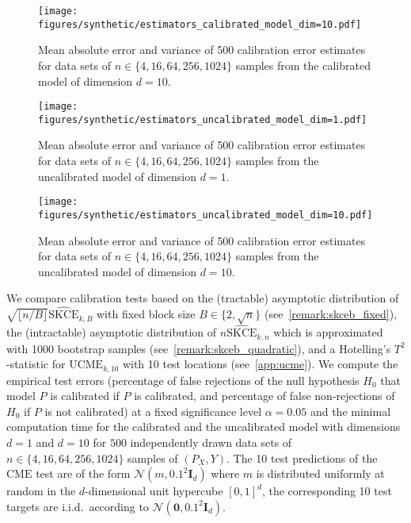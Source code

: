 \documentclass{article}
\begin{document}
\begin{figure}[hpt]
    \begin{center}
        \texttt{[image: figures/synthetic/estimators\_calibrated\_model\_dim=10.pdf]}
        \caption{Mean absolute error and variance of 500 calibration error estimates for
        data sets of $n \in \{4, 16, 64, 256, 1024\}$ samples from the calibrated model
        of dimension $d = 10$.}
        \label{fig:synthetic_estimators_calibrated_10}
    \end{center}
\end{figure}

\begin{figure}[hpt]
    \begin{center}
        \texttt{[image: figures/synthetic/estimators\_uncalibrated\_model\_dim=1.pdf]}
        \caption{Mean absolute error and variance of 500 calibration error estimates for
        data sets of $n \in \{4, 16, 64, 256, 1024\}$ samples from the uncalibrated model
        of dimension $d = 1$.}
        \label{fig:synthetic_estimators_uncalibrated_1}
    \end{center}
\end{figure}

\begin{figure}[hpt]
    \begin{center}
        \texttt{[image: figures/synthetic/estimators\_uncalibrated\_model\_dim=10.pdf]}
        \caption{Mean absolute error and variance of 500 calibration error estimates for
        data sets of $n \in \{4, 16, 64, 256, 1024\}$ samples from the uncalibrated model
        of dimension $d = 10$.}
        \label{fig:synthetic_estimators_uncalibrated_10}
    \end{center}
\end{figure}

We compare calibration tests based on the (tractable) asymptotic distribution of
$\sqrt{\lfloor n / B \rfloor} \widehat{\mathrm{SKCE}}_{k,B}$ with fixed block
size $B \in \{2, \sqrt{n}\}$
(see~\cref{remark:skceb_fixed}), the (intractable) asymptotic distribution of
$n\widehat{\mathrm{SKCE}}_{k,n}$ which is approximated with 1000 bootstrap
samples (see~\cref{remark:skceb_quadratic}), and a Hotelling's $T^2$-statistic for
$\mathrm{UCME}_{k,10}$ with 10 test locations (see~\cref{app:ucme}). We compute
the empirical test errors (percentage of false rejections of the null hypothesis $H_0$
that model $P$ is calibrated if $P$ is calibrated, and percentage of false non-rejections
of $H_0$ if $P$ is not calibrated) at a fixed significance level $\alpha = 0.05$ and
the minimal computation time for the calibrated and the uncalibrated model with
dimensions $d = 1$ and $d = 10$ for $500$ independently drawn data sets of
$n \in \{4, 16, 64, 256, 1024\}$ samples of $(P_X, Y)$. The 10 test
predictions of the $\mathrm{CME}$ test are of the form $\mathcal{N}(m, 0.1^2 \mathbf{I}_d)$
where $m$ is distributed uniformly at random in the $d$-dimensional unit hypercube $[0,1]^d$,
the corresponding 10 test targets are i.i.d.\ according to
$\mathcal{N}(\mathbf{0}, 0.1^2 \mathbf{I}_d)$.
\end{document}
